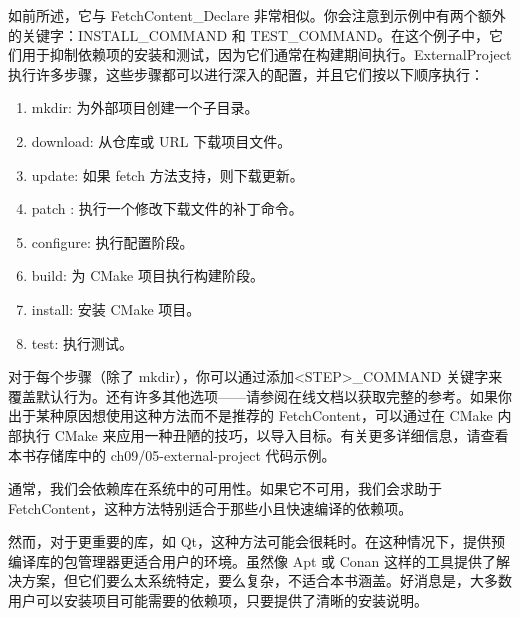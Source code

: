 如前所述，它与 FetchContent\_Declare 非常相似。你会注意到示例中有两个额外的关键字：INSTALL\_COMMAND 和 TEST\_COMMAND。在这个例子中，它们用于抑制依赖项的安装和测试，因为它们通常在构建期间执行。ExternalProject 执行许多步骤，这些步骤都可以进行深入的配置，并且它们按以下顺序执行：

\begin{enumerate}
\item
mkdir: 为外部项目创建一个子目录。

\item
download: 从仓库或 URL 下载项目文件。

\item
update: 如果 fetch 方法支持，则下载更新。

\item
patch : 执行一个修改下载文件的补丁命令。

\item
configure: 执行配置阶段。

\item
build: 为 CMake 项目执行构建阶段。

\item
install: 安装 CMake 项目。

\item
test: 执行测试。
\end{enumerate}

对于每个步骤（除了 mkdir），你可以通过添加<STEP>\_COMMAND 关键字来覆盖默认行为。还有许多其他选项——请参阅在线文档以获取完整的参考。如果你出于某种原因想使用这种方法而不是推荐的 FetchContent，可以通过在 CMake 内部执行 CMake 来应用一种丑陋的技巧，以导入目标。有关更多详细信息，请查看本书存储库中的 ch09/05-external-project 代码示例。

通常，我们会依赖库在系统中的可用性。如果它不可用，我们会求助于 FetchContent，这种方法特别适合于那些小且快速编译的依赖项。

然而，对于更重要的库，如 Qt，这种方法可能会很耗时。在这种情况下，提供预编译库的包管理器更适合用户的环境。虽然像 Apt 或 Conan 这样的工具提供了解决方案，但它们要么太系统特定，要么复杂，不适合本书涵盖。好消息是，大多数用户可以安装项目可能需要的依赖项，只要提供了清晰的安装说明。




